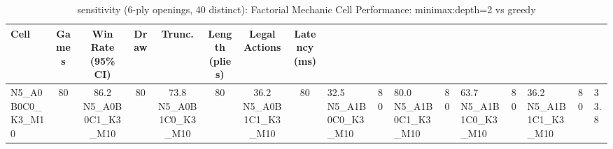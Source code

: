 \begin{table}[htbp]
\centering
\caption{sensitivity (6-ply openings, 40 distinct): Factorial Mechanic Cell Performance: minimax:depth=2 vs greedy}
\label{tab:ablation_cells}
\begin{tabular}{lccccccc}
\toprule
Cell & Games & Win Rate (95\% CI) & Draw & Trunc. & Length (plies) & Legal Actions & Latency (ms) \\
\midrule
N5\_A0B0C0\_K3\_M10 & 80 & 86.2%
N5\_A0B0C1\_K3\_M10 & 80 & 73.8%
N5\_A0B1C0\_K3\_M10 & 80 & 36.2%
N5\_A0B1C1\_K3\_M10 & 80 & 32.5%
N5\_A1B0C0\_K3\_M10 & 80 & 80.0%
N5\_A1B0C1\_K3\_M10 & 80 & 63.7%
N5\_A1B1C0\_K3\_M10 & 80 & 36.2%
N5\_A1B1C1\_K3\_M10 & 80 & 33.8%
\bottomrule
\end{tabular}
\end{table}

